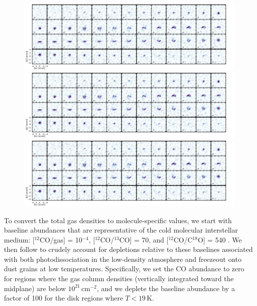 \documentclass[twocolumn]{aastex6}
\begin{document}
\begin{figure}[ht!]
\begin{center}
  \includegraphics[width=\linewidth]{chanmaps_c18o.pdf}
  \includegraphics[width=\linewidth]{chanmaps_c18o.pdf}
  \includegraphics[width=\linewidth]{chanmaps_c18o.pdf}
  \end{center}
\end{figure}


To convert the total gas densities to molecule-specific values, we start with baseline abundances that are representative of the cold molecular interstellar medium: [$^{12}$CO/gas] = 10$^{-4}$, [$^{12}$CO/$^{13}$CO] = 70, and [$^{12}$CO/C$^{18}$O] = 540 \citep[e.g.,][]{henkel94,prantzos96}.  We then follow \citet{qi08} to crudely account for depletions relative to these baselines associated with both photodissociation in the low-density atmosphere and freezeout onto dust grains at low temperatures.  Specifically, we set the CO abundance to zero for regions where the gas column densities (vertically integrated toward the midplane) are below $10^{21}$\,cm$^{-2}$, and we deplete the baseline abundance by a factor of 100 for the disk regions where $T<19$\,K.
\end{document}
